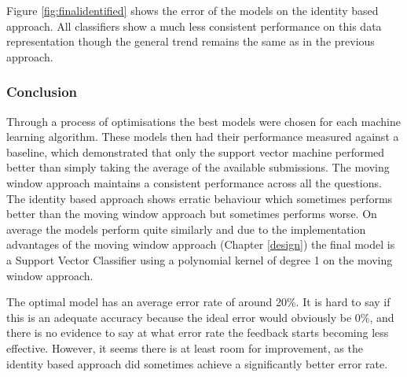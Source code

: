 Figure \ref{fig:finalidentified} shows the error of the models on the identity based approach. All classifiers show a much less consistent performance on this data representation though the general trend remains the same as in the previous approach. 

\subsubsection{Conclusion}
Through a process of optimisations the best models were chosen for each machine learning algorithm. These models then had their performance measured against a baseline, which demonstrated that only the support vector machine performed better than simply taking the average of the available submissions. The moving window approach maintains a consistent performance across all the questions. The identity based approach shows erratic behaviour which sometimes performs better than the moving window approach but sometimes performs worse. On average the models perform quite similarly and due to the implementation advantages of the moving window approach (Chapter \ref{design}) the final model is a Support Vector Classifier using a polynomial kernel of degree 1 on the moving window approach.

The optimal model has an average error rate of around 20\%. It is hard to say if this is an adequate accuracy because the ideal error would obviously be 0\%, and there is no evidence to say at what error rate the feedback starts becoming less effective. However, it seems there is at least room for improvement, as the identity based approach did sometimes achieve a significantly better error rate.
